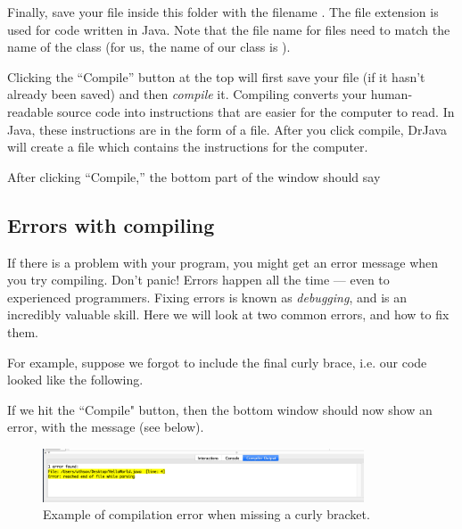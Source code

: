 Finally, save your file inside this folder with the filename . The  file extension is used for code written in Java. 
Note that the file name for  files need to match the name of the class (for us, the name of our class is ).

Clicking the ``Compile'' button at the top will first save your file (if it hasn't already been saved) and then \emph{compile} it. Compiling converts your human-readable
source code into instructions that are easier for the computer to read. In Java, these instructions are in the form of a  file. After you click compile, DrJava will create a
 file which contains the instructions for the computer.


After clicking ``Compile,'' the bottom part of the window should say

\subsection{Errors with compiling}

If there is a problem with your program, you might get an error message when you try compiling. Don't panic! Errors happen all the time --- even to experienced programmers. Fixing errors is known as \emph{debugging}, and is an incredibly valuable skill. Here we will look at two common errors, and how to fix them. 

For example, suppose we forgot to include the final curly brace, i.e. our code looked like the following.

\begin{code}
class HelloWorld {
    
    public static void main(String[] args) {
        System.out.println("Hello World!");
    }
\end{code}

If we hit the  ``Compile" button, then the bottom window should now show an error, with the message  (see below).

\begin{figure}[ht]
	\centering
	\includegraphics[width=0.85\textwidth]{images/hello_world_error.png}
	\caption{Example of compilation error when missing a curly bracket.}
	\label{fig:helloworld:sec:error}
\end{figure}

